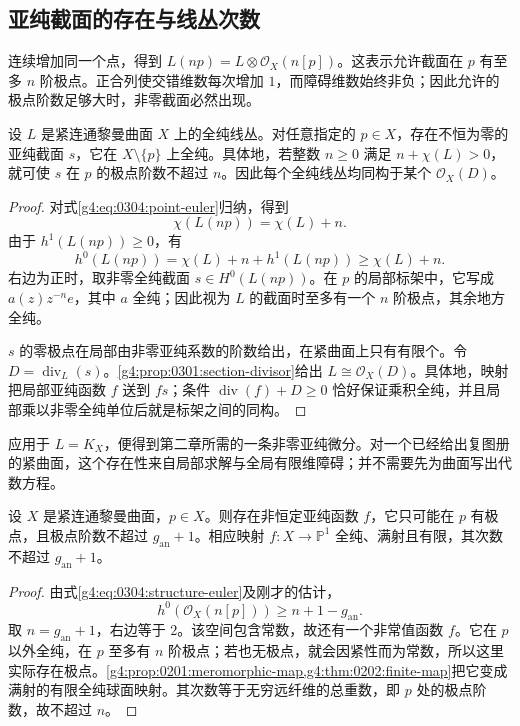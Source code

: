 \subsection{亚纯截面的存在与线丛次数}
\label{g4:subsec:0304:03}

连续增加同一个点，得到 \(L(np)=L\otimes\mathcal O_X(n[p])\)。这表示允许截面在 \(p\) 有至多 \(n\) 阶极点。正合列使交错维数每次增加 \(1\)，而障碍维数始终非负；因此允许的极点阶数足够大时，非零截面必然出现。

\begin{theorem}
	\label{g4:thm:0304:meromorphic-section}
	设 \(L\) 是紧连通黎曼曲面 \(X\) 上的全纯线丛。对任意指定的 \(p\in X\)，存在不恒为零的亚纯截面 \(s\)，它在 \(X\setminus\{p\}\) 上全纯。具体地，若整数 \(n\ge0\) 满足 \(n+\chi(L)>0\)，就可使 \(s\) 在 \(p\) 的极点阶数不超过 \(n\)。因此每个全纯线丛均同构于某个 \(\mathcal O_X(D)\)。
\end{theorem}
\begin{proof}
	对式\eqref{g4:eq:0304:point-euler}归纳，得到
	\[
		\chi(L(np))=\chi(L)+n.
	\]
	由于 \(h^1(L(np))\ge0\)，有
	\[
		h^0(L(np))=\chi(L)+n+h^1(L(np))\ge\chi(L)+n.
	\]
	右边为正时，取非零全纯截面 \(s\in H^0(L(np))\)。在 \(p\) 的局部标架中，它写成 \(a(z)z^{-n}e\)，其中 \(a\) 全纯；因此视为 \(L\) 的截面时至多有一个 \(n\) 阶极点，其余地方全纯。

	\(s\) 的零极点在局部由非零亚纯系数的阶数给出，在紧曲面上只有有限个。令 \(D=\operatorname{div}_L(s)\)。\cref{g4:prop:0301:section-divisor}给出 \(L\cong\mathcal O_X(D)\)。具体地，映射把局部亚纯函数 \(f\) 送到 \(fs\)；条件 \(\operatorname{div}(f)+D\ge0\) 恰好保证乘积全纯，并且局部乘以非零全纯单位后就是标架之间的同构。
\end{proof}

应用于 \(L=K_X\)，便得到第二章所需的一条非零亚纯微分。对一个已经给出复图册的紧曲面，这个存在性来自局部求解与全局有限维障碍；并不需要先为曲面写出代数方程。

\begin{corollary}
	\label{g4:cor:0304:meromorphic-map-existence}
	设 \(X\) 是紧连通黎曼曲面，\(p\in X\)。则存在非恒定亚纯函数 \(f\)，它只可能在 \(p\) 有极点，且极点阶数不超过 \(g_{\mathrm{an}}+1\)。相应映射 \(f:X\to\mathbb P^1\) 全纯、满射且有限，其次数不超过 \(g_{\mathrm{an}}+1\)。
\end{corollary}
\begin{proof}
	由式\eqref{g4:eq:0304:structure-euler}及刚才的估计，
	\[
		h^0(\mathcal O_X(n[p]))\ge n+1-g_{\mathrm{an}}.
	\]
	取 \(n=g_{\mathrm{an}}+1\)，右边等于 \(2\)。该空间包含常数，故还有一个非常值函数 \(f\)。它在 \(p\) 以外全纯，在 \(p\) 至多有 \(n\) 阶极点；若也无极点，就会因紧性而为常数，所以这里实际存在极点。\cref{g4:prop:0201:meromorphic-map,g4:thm:0202:finite-map}把它变成满射的有限全纯球面映射。其次数等于无穷远纤维的总重数，即 \(p\) 处的极点阶数，故不超过 \(n\)。
\end{proof}

